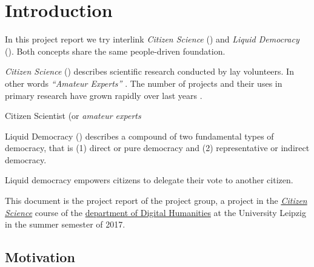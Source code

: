 \chapter{Introduction}
\label{ch:Introduction}


In this project report we try interlink \textit{Citizen Science} () and \textit{Liquid Democracy} (). Both concepts share the same people-driven foundation.

\textit{Citizen Science} () describes scientific research conducted by lay volunteers. In other words \textit{“Amateur Experts”}  \parencite{Gura2013}. The number of  projects and their uses in primary research have grown rapidly over last years \parencite{Kosmala2016}. 

Citizen Scientist (or \textit{amateur experts} \parencite{Gura2013}

Liquid Democracy () describes a compound of two fundamental types of democracy, that is (1) direct or pure democracy and (2) representative or indirect democracy. 

Liquid democracy empowers citizens to delegate their vote to another citizen. 



This document is the project report of the  project group, a project in the \href{http://www.dh.uni-leipzig.de/wo/courses/summer-semester-20142015/citizen-science/}{\textit{Citizen Science}} course of the \href{http://www.dh.uni-leipzig.de/wo/}{department of Digital Humanities} at the University Leipzig in the summer semester of 2017.

\section{Motivation}
\label{sec:Motivation}

